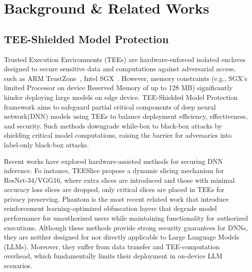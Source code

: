 \documentclass{article}
\begin{document}
\section{Background \& Related Works}
\label{related_works}
\subsection{TEE-Shielded Model Protection}
Trusted Execution Environments (TEEs) are hardware-enforced isolated enclaves designed to secure sensitive data and computations against adversarial access, such as ARM TrustZone~\cite{alves2004trustzone}, Intel SGX~\cite{costan2016intel}. However, memory constraints (e.g., SGX’s limited Processor on device Reserved Memory of up to 128 MB\cite{zhou2023nnsplitter}) significantly hinder deploying large models on edge device. 
TEE-Shielded Model Protection framework aims to safeguard partial critical components of deep neural network(DNN) models using TEEs to balance deployment efficiency, effectiveness, and security. Such methods downgrade while-box to black-box attacks by shielding critical model computations, raising the barrier for adversaries into label-only black-box attacks. 

Recent works\cite{AnonymousCoder2025Phantom,zhou2023nnsplitter,islam2023confidential,zhang2024no,sun2023shadownet,mo2020darknetz} have explored hardware-assisted methods for securing DNN inference. Fo instance, TEESlice\cite{zhang2024no} propose a dynamic slicing mechanism for ResNet-34/VGG16, where extra slices are introduced and those with minimal accuracy loss slices are dropped, only critical slices are placed in TEEs for privacy preserving. Phantom is the most recent related work that introduce reinforcement learning-optimized obfuscation layers that degrade model performance for unauthorized users while maintaining functionality for authorized executions. 
Although these methods provide strong security guarantees for DNNs, they are neither designed for nor directly applicable to Large Language Models (LLMs). Moreover, they suffer from data transfer and TEE-computation overhead, which fundamentally limits their deployment in on-device LLM scenarios.
\end{document}
